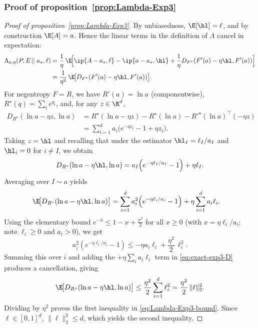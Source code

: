 \subsubsection{Proof of proposition~\ref{prop:Lambda-Exp3}}
\label{proof:prop:Lambda-Exp3}
\begin{proof}[Proof of proposition~\ref{prop:Lambda-Exp3}]
    By unbiasedness, $\E[\hl]=\ell$, and by construction $\E[A]=a$. Hence the
    linear terms in the definition of $\Lambda$ cancel in expectation:
    \begin{align*}
        \Lambda_{a,\eta}(P,E\!\mid\mid a_\star,\ell)
         & =\frac{1}{\eta}\,\E\!\Big[\ip{A-a_\star,\ell}-\ip{a-a_\star,\hl}
        +\frac{1}{\eta}D_{F^\star}(F'(a)-\eta \hl,F'(a))\Big]                  \\
         & =\frac{1}{\eta^2}\,\E\!\big[D_{F^\star}(F'(a)-\eta \hl,F'(a))\big].
    \end{align*}
    For negentropy $F=R$, we have $R'(a)=\ln a$ (componentwise),
    $R^\star(q)=\sum_i e^{q_i}$, and, for any $z\in\R^d$,
    \begin{align*}
        D_{R^\star}(\ln a-\eta z,\ln a)
         & = R^\star(\ln a-\eta z)-R^\star(\ln a)
        - R'^\star(\ln a)^\top(-\eta z)                         \\
         & =\sum_{i=1}^d a_i\Big(e^{-\eta z_i}-1+\eta z_i\Big).
    \end{align*}
    Taking $z=\hl$ and recalling that under the estimator
    $\hl_I=\ell_I/a_I$ and $\hl_i=0$ for $i\neq I$, we obtain
    \[
        D_{R^\star}(\ln a-\eta \hl,\ln a)
        = a_I\!\left(e^{-\eta \ell_I/a_I}-1\right)+\eta \ell_I.
    \]
    Averaging over $I\sim a$ yields
    \begin{align}
        \E\!\big[D_{R^\star}(\ln a-\eta \hl,\ln a)\big]
         & =\sum_{i=1}^d a_i^2\!\left(e^{-\eta \ell_i/a_i}-1\right)+\eta \sum_{i=1}^d a_i \ell_i.
        \label{eq:exact-exp3-D}
    \end{align}
    Using the elementary bound $e^{-x}\le 1-x+\tfrac{x^2}{2}$ for all $x\ge 0$
    (with $x=\eta \ell_i/a_i$; note $\ell_i\ge 0$ and $a_i>0$), we get
    \[
        a_i^2\!\left(e^{-\eta \ell_i/a_i}-1\right)
        \le -\eta a_i\ell_i+\frac{\eta^2}{2}\,\ell_i^2.
    \]
    Summing this over $i$ and adding the $+\eta\sum_i a_i\ell_i$ term in
    \eqref{eq:exact-exp3-D} produces a cancellation, giving
    \[
        \E\!\big[D_{R^\star}(\ln a-\eta \hl,\ln a)\big]
        \le \frac{\eta^2}{2}\sum_{i=1}^d \ell_i^2
        = \frac{\eta^2}{2}\,\|\ell\|_2^2.
    \]
    Dividing by $\eta^2$ proves the first inequality in
    \eqref{eq:Lambda-Exp3-bound}. Since $\ell\in[0,1]^d$,
    $\|\ell\|_2^2\le d$, which yields the second inequality.
\end{proof}
